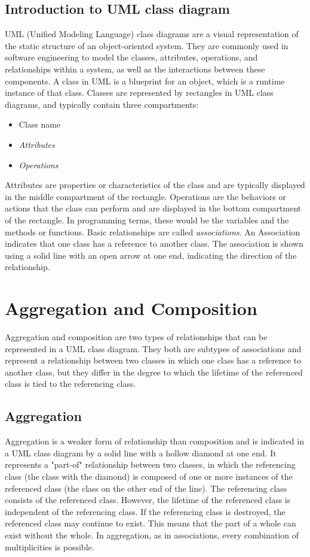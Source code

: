 \documentclass[
	12pt,
    a4paper,
    egregdoesnotlikesansseriftitles, %
    toc=chapterentrywithdots,
    oneside, openany,
    titlepage,
    parskip=half,
    headings=normal,  %
    listof=totoc,
    bibliography=totocnumbered,
    index=totoc,
    captions=tableheading,  %
    listof=flat,
    numbers=noenddot, %
    final]
    {scrbook}
\begin{document}
\section{Introduction to UML class diagram}
UML (Unified Modeling Language) class diagrams are a visual representation of the static structure of an object-oriented system. 
They are commonly used in software engineering to model the classes, attributes, operations, and relationships within a system, as well as the interactions between these components. 
A class in UML is a blueprint for an object, which is a runtime instance of that class. 
Classes are represented by rectangles in UML class diagrams, and typically contain three compartments:
\cite{uml-diagrams} 
\begin{itemize}
	\item Class name
	\item \emph{Attributes}
	\item \emph{Operations}
\end{itemize}
Attributes are properties or characteristics of the class and are typically displayed in the middle compartment of the rectangle.
Operations are the behaviors or actions that the class can perform and are displayed in the bottom compartment of the rectangle.
In programming terms, these would be the variables and the methods or functions.
Basic relationships are called \emph{associations}. 
An Association indicates that one class has a reference to another class. \cite[p. 108-111]{uml}
The association is shown using a solid line with an open arrow at one end, indicating the direction of the relationship. \cite[p. 142-143]{uml}

\chapter{Aggregation and Composition}
Aggregation and composition are two types of relationships that can be represented in a UML class diagram. 
They both are subtypes of associations and represent a relationship between two classes in which one class has a reference to another class, but they differ in the degree to which the lifetime of the referenced class is tied to the referencing class.

\section{Aggregation}
Aggregation is a weaker form of relationship than composition and is indicated in a UML class diagram by a solid line with a hollow diamond at one end. 
It represents a "part-of" relationship between two classes, in which the referencing class (the class with the diamond) is composed of one or more instances of the referenced class (the class on the other end of the line).
The referencing class consists of the referenced class.
However, the lifetime of the referenced class is independent of the referencing class.
If the referencing class is destroyed, the referenced class may continue to exist.
This means that the part of a whole can exist without the whole.
In aggregation, as in associations, every combination of multiplicities is possible. \cite[p. 153]{uml}
\end{document}
